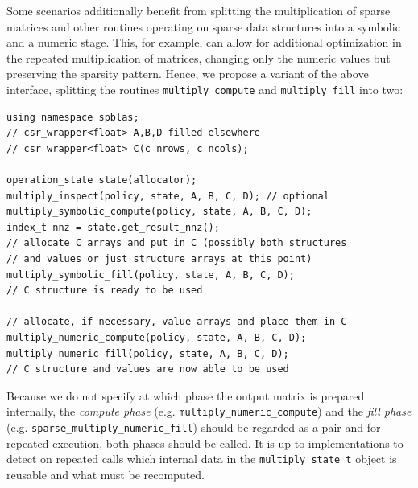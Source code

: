 
\iffalse

Some scenarios additionally benefit from splitting the multiplication of sparse matrices and other routines operating on sparse data structures into a symbolic and a numeric stage. This, for example, can allow for additional optimization in the repeated multiplication of matrices, changing only the numeric values but preserving the sparsity pattern. Hence, we propose a variant of the above interface, splitting the routines
\texttt{multiply\_compute} and
\texttt{multiply\_fill} into two:

\begin{verbatim}
using namespace spblas;
// csr_wrapper<float> A,B,D filled elsewhere
// csr_wrapper<float> C(c_nrows, c_ncols);

operation_state state(allocator);
multiply_inspect(policy, state, A, B, C, D); // optional
multiply_symbolic_compute(policy, state, A, B, C, D);
index_t nnz = state.get_result_nnz();
// allocate C arrays and put in C (possibly both structures
// and values or just structure arrays at this point)
multiply_symbolic_fill(policy, state, A, B, C, D);
// C structure is ready to be used

// allocate, if necessary, value arrays and place them in C
multiply_numeric_compute(policy, state, A, B, C, D);
multiply_numeric_fill(policy, state, A, B, C, D);
// C structure and values are now able to be used
\end{verbatim}



Because we do not specify at which phase the output matrix is prepared internally, the \textit{compute phase} (e.g. \texttt{multiply\_numeric\_compute}) and the \textit{fill phase} (e.g. \texttt{sparse\_multiply\_numeric\_fill}) should be regarded as a pair and for repeated execution, both phases should be called.  It is up to implementations to detect on repeated calls which internal data in the \texttt{multiply\_state\_t} object is reusable and what must be recomputed.

